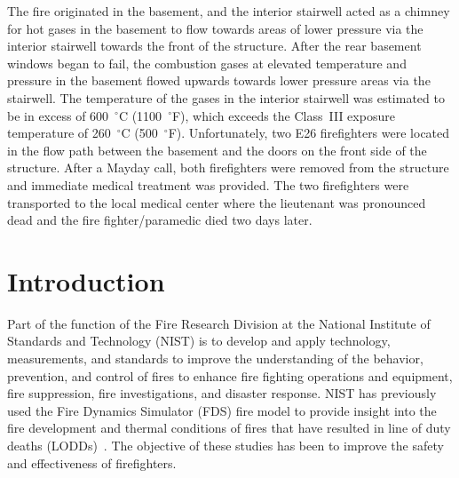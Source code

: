\documentclass[12pt,oneside]{book}
\begin{document}
The fire originated in the basement, and the interior stairwell acted as a chimney for hot gases in the basement to flow towards areas of lower pressure via the interior stairwell towards the front of the structure. After the rear basement windows began to fail, the combustion gases at elevated temperature and pressure in the basement flowed upwards towards lower pressure areas via the stairwell. The temperature of the gases in the interior stairwell was estimated to be in excess of 600~$^{\circ}$C (1100~$^{\circ}$F), which exceeds the Class~III exposure temperature of 260~$^{\circ}$C (500~$^{\circ}$F). Unfortunately, two E26 firefighters were located in the flow path between the basement and the doors on the front side of the structure. After a Mayday call, both firefighters were removed from the structure and immediate medical treatment was provided. The two firefighters were transported to the local medical center where the lieutenant was pronounced dead and the fire fighter/paramedic died two days later.


\chapter{Introduction}
\label{sec:introduction}
\setcounter{page}{1}

Part of the function of the Fire Research Division at the National Institute of Standards and Technology (NIST) is to develop and apply technology, measurements, and standards to improve the understanding of the behavior, prevention, and control of fires to enhance fire fighting operations and equipment, fire suppression, fire investigations, and disaster response. NIST has previously used the Fire Dynamics Simulator (FDS) fire model to provide insight into the fire development and thermal conditions of fires that have resulted in line of duty deaths (LODDs)~\cite{Madrzykowski:1,Iowa,Texas,Bryner:Charleston,barowy:texas,Weinschenk:Chicago}. The objective of these studies has been to improve the safety and effectiveness of firefighters.
\end{document}

